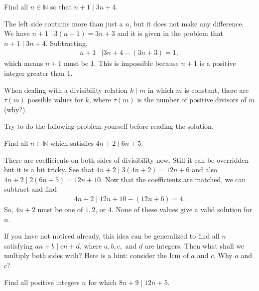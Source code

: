 \documentclass{subfile}
\begin{document}
		\begin{problem}
			Find all $n \in \mathbb{N}$ so that $n+1\mid 3n+4$.
		\end{problem}

		\begin{solution}
			The left side contains more than just a $n$, but it does not make any difference. We have $n+1 \mid 3(n+1)=3n+3$ and it is given in the problem that $n+1 \mid 3n+4$. Subtracting,
				\begin{align*}
					n+1
						&\mid 3n+4-(3n+3)=1,
				\end{align*}
			which means $n+1$ must be $1$. This is impossible because $n+1$ is a positive integer greater than $1$.
		\end{solution}

		\begin{note}
			When dealing with a divisibility relation $k\mid m$ in which $m$ is constant, there are $\tau(m)$ possible values for $k$, where $\tau(m)$ is the number of positive divisors of $m$ (why?).
		\end{note}
	Try to do the following problem yourself before reading the solution.
		\begin{problem}
			Find all $n\in\mathbb{N}$ which satisfies $4n+2\mid 6n+5$.
		\end{problem}

		\begin{solution}
			There are coefficients on both sides of divisibility now. Still it can be overridden but it is a bit tricky. See that $4n+2\mid 3(4n+2)=12n+6$ and also $4n+2 \mid 2(6n+5)=12n+10$. Now that the coefficients are matched, we can subtract and find
				\begin{align*}
					4n+2\mid 12n+10-(12n+6)=4.
				\end{align*}
			So, $4n+2$ must be one of $1,2$, or $4$. None of these values give a valid solution for $n$.
		\end{solution}
	If you have not noticed already, this idea can be generalized to find all $n$ satisfying $an+b\mid cn+d$, where $a,b,c,$ and $d$ are integers. Then what shall we multiply both sides with? Here is a hint: consider the $\operatorname{lcm}$ of $a$ and $c$. Why $a$ and $c$?
		\begin{problem}\label{prob:ex1}
			Find all positive integers $n$ for which $8n+9\mid 12n+5$.
		\end{problem}
\end{document}
